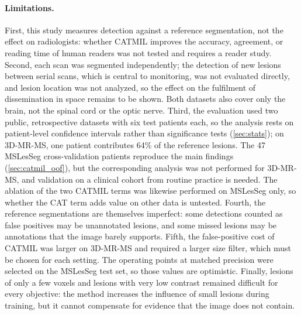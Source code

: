 \paragraph{Limitations.}
First, this study measures detection
against a reference segmentation, not the effect on radiologists: whether
CATMIL improves the accuracy, agreement, or reading time of human readers
was not tested and requires a reader study. Second, each scan was segmented
independently; the detection of new lesions between serial scans, which is
central to monitoring, was not evaluated directly, and lesion location was
not analyzed, so the effect on the fulfilment of dissemination in space
remains to be shown. Both datasets also cover only the brain, not the
spinal cord or the optic nerve. Third, the evaluation used two public,
retrospective datasets with six test patients each, so the analysis rests
on patient-level confidence intervals rather than significance tests
(\cref{sec:stats}); on 3D-MR-MS, one patient contributes 64\% of the
reference lesions. The 47 MSLesSeg
cross-validation patients reproduce the main findings
(\cref{sec:catmil_oof}), but the corresponding analysis was not performed
for 3D-MR-MS, and validation on a clinical cohort from routine practice is
needed. The ablation of the two CATMIL terms was likewise performed on
MSLesSeg only, so whether the CAT term adds value on other data is
untested. Fourth, the reference segmentations are themselves imperfect: some
detections counted as false positives may be unannotated lesions, and some
missed lesions may be annotations that the image barely supports. Fifth,
the false-positive cost of CATMIL was larger on 3D-MR-MS and required a
larger size filter, which must be chosen for each setting. The operating
points at matched precision were selected on the MSLesSeg test set, so
those values are optimistic. Finally, lesions of only a few voxels and
lesions with very low contrast remained difficult for every objective: the
method increases the influence of small lesions during training, but it
cannot compensate for evidence that the image does not contain.

